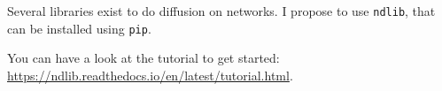 \documentclass[addpoints]{exam}
\newcommand{\code}[1]{\colorbox{light-gray}{\texttt{#1}}}
\begin{document}
\begin{center}
\end{center}




\begin{tcolorbox}[colback=black!5!white,colframe=white!75!black]
Several libraries exist to do diffusion on networks. I propose to use \code{ndlib}, that can be installed using \code{pip}. 

You can have a look at the tutorial to get started: \url{https://ndlib.readthedocs.io/en/latest/tutorial.html}.


\end{tcolorbox}
\end{document}

